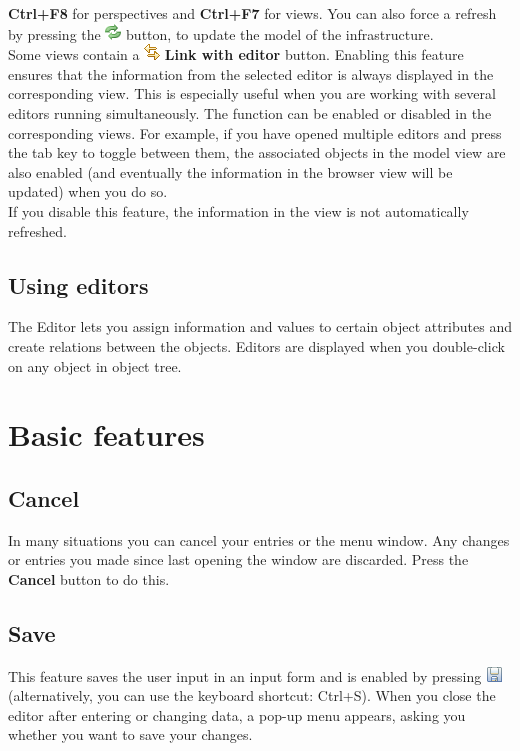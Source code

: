 \documentclass[a4paper,10pt]{book}
\begin{document}
\textbf{Ctrl+F8} for perspectives and \textbf{Ctrl+F7} for views. You can also force a refresh by pressing the
\includegraphics[height=2ex]{Icon/Aktualisieren.png} button, to update the model of the infrastructure.
\newline\\
Some views contain a \includegraphics[height=2ex]{Icon/Verinice_linked.png} \textbf{Link with editor} button.
Enabling this feature ensures that the information from the selected editor is always displayed in the corresponding view.
This is especially useful when you are working with several editors running simultaneously.
The function can be enabled or disabled in the corresponding views. For example, if you have opened
multiple editors and press the tab key to toggle between them, the associated
objects in the model view are also enabled (and eventually the information in
the browser view will be updated) when you do so.
\newline\\
If you disable this feature, the information in the view is not automatically refreshed.

\section{Using editors}

The Editor lets you assign information and values to certain object attributes and create relations between the objects.
Editors are displayed when you double-click on any object in object tree.


\chapter{Basic features}
\section{Cancel}
In many situations you can cancel your entries or the menu window. Any changes or entries you made since last opening
the window are discarded. Press the \textbf{Cancel} button to do this.

\section{Save}
This feature saves the user input in an input form and is enabled by pressing
\includegraphics[height=2ex]{Icon/Disk.png} (alternatively, you can use the keyboard shortcut: Ctrl+S).
When you close the editor after entering or changing data, a pop-up menu appears, asking you whether you
want to save your changes.
\end{document}
